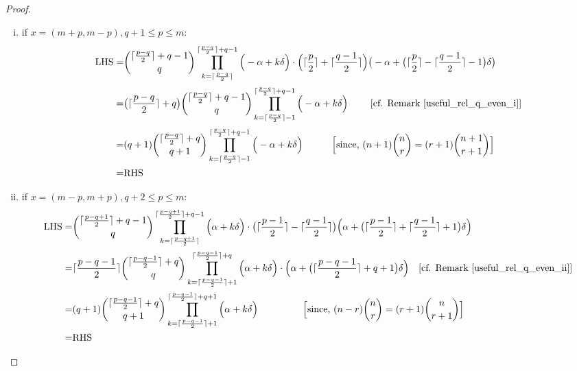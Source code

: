 \documentclass[10pt, a4paper, reqno]{amsart}
\begin{document}
\begin{proof}
	
	\begin{enumerate}[(i)]
		\item if $x=(m+p,m-p), q+1\leq p\leq m$:
		\[\begin{split}
			\text{LHS}=& \displaystyle	\binom{\lceil \frac{p-q}{2} \rceil + q-1}{\,q\,}\prod_{k=\lceil \frac{p-q}{2} \rceil}^{\lceil \frac{p-q}{2} \rceil +q-1}\Big(-\alpha +k\delta\Big)  \cdot\Big( \lceil \frac{p}{2} \rceil +\lceil \frac{q-1}{2} \rceil\Big) \big(-\alpha +\big(\lceil \frac{p}{2} \rceil -\lceil \frac{q-1}{2} \rceil -1\big)\delta\big)     \\
			=&  \displaystyle       \big(\lceil\frac{p-q}{2}\rceil+q\big)           \binom{\lceil \frac{p-q}{2} \rceil + q-1}{\,q\,}              \prod_{k=\lceil \frac{p-q}{2} \rceil -1}^{\lceil \frac{p-q}{2} \rceil +q-1}\Big(-\alpha +k\delta\Big)        \text{ ~~~~~~[cf. Remark \ref{useful_rel_q_even_i}]}  \\
			=&(q+1) \displaystyle	\binom{\lceil \frac{p-q}{2} \rceil + q}{\,q+1\,}\prod_{k=\lceil \frac{p-q}{2} \rceil -1}^{\lceil \frac{p-q}{2} \rceil +q-1}\Big(-\alpha +k\delta\Big)  ~~~~~~~~~ \text{\Big [since, $(n+1)\binom{n}{r}=(r+1)\binom{n+1}{r+1}$\Big]}   \\
			=&\text{RHS}
		\end{split}\]
		
		\item if $x=(m-p,m+p), q+2\leq p\leq m$:
		\[\begin{split}
			\text{LHS}=&\displaystyle\binom{\lceil \frac{p-q+1}{2} \rceil+ q-1}{\,q\,}\prod_{k=\lceil \frac{p-q+1}{2} \rceil}^{\lceil \frac{p-q+1}{2} \rceil+q-1 }\Big(\alpha+k\delta \Big)\cdot  \big( \lceil\frac{p-1}{2}\rceil-\lceil\frac{q-1}{2}\rceil \big)\Big(\alpha+\big(\lceil\frac{p-1}{2}\rceil+\lceil\frac{q-1}{2}\rceil +1\big)\delta \Big)\\
			=&\displaystyle \lceil \frac{p-q-1}{2} \rceil\binom{\lceil \frac{p-q-1}{2} \rceil+q }{\,q\,}\prod_{k=\lceil \frac{p-q-1}{2} \rceil+1}^{\lceil \frac{p-q-1}{2} \rceil+q }\Big(\alpha+k\delta \Big)\cdot  \Big(\alpha+\big(\lceil \frac{p-q-1}{2} \rceil +q+1 \big)\delta \Big)       \text{ ~~[cf. Remark \ref{useful_rel_q_even_ii}]} \\
			=&(q+1)\displaystyle	\binom{\lceil \frac{p-q-1}{2} \rceil + q}{\,q+1\,}\prod_{k=\lceil \frac{p-q-1}{2} \rceil +1}^{\lceil \frac{p-q-1}{2} \rceil +q+1}\Big(\alpha +k\delta\Big)  ~~~~~~~~~  ~~~~~ \text{\Big [since, $(n-r)\binom{n}{r}=(r+1)\binom{n}{r+1}$\Big]}   \\
			=&\text{RHS}
		\end{split}\] 	
	\end{enumerate}\end{proof}
\end{document}
